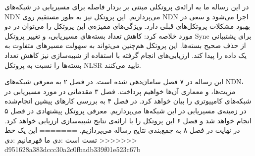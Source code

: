 در این رساله ما به ارائه‌ی پروتکلی مبتنی بر بردار فاصله برای مسیریابی در شبکه‌های NDN می‌پردازیم. این پروتکل نیز به طور مستقیم روی NDN اجرا می‌شود و سعی در بهبود مشکلات پروتکل‌های قبلی دارد. ویژگی‌های ممیزه‌ی این پروتکل را می‌توان در دو مورد خلاصه کرد: کاهش تعداد بسته‌های مسیریابی، و تغییر پروتکل Sync برای پشتیبانی از حذف صحیح بسته‌ها. این پروتکل هم‌چنین می‌تواند به سهولت مسیرهای متفاوت به یک داده را پیدا کند. ارزیابی‌های انجام گرفته با استفاده از شبیه‌سازی نیز کاهش تعداد بسته‌ها را نسبت به پروتکل NLSR تایید می‌کنند. 

این رساله در ۷ فصل سامان‌دهی شده است. در فصل ۲ به معرفی شبکه‌های NDN، مزیت‌ها، و معماری آن‌ها خواهیم پرداخت. فصل ۳ مقدماتی در مورد مسیریابی در شبکه‌های کامپیوتری را بیان خواهد کرد. در فصل ۴ به بررسی کارهای پیشین انجام‌شده در زمینه‌ی مسیریابی در این شبکه‌ها می‌پردازیم. معرفی پروتکل پیشنهادی در فصل ۵ انجام خواهد شد و فصل ۶ این پروتکل را با ارائه‌ی نتایج شبیه‌سازی ارزیابی خواهد کرد. در نهایت در فصل ۸ به جمع‌بندی نتایج رساله می‌پردازیم. 
=======
این یک خط تست است :دی 
ما قهرمانیم :دی 
>>>>>>> d951628a383dccc30a2c0fbadb339f01e523c67b
